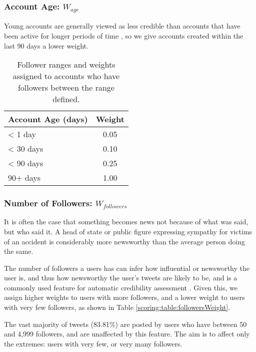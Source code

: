 \subsubsection{Account Age: \(W_{age}\)}
Young accounts are generally viewed as less credible than accounts that have been active for longer periods of time \citep{Sikdar13}, so we give accounts created within the last 90 days a lower weight.

\begin{table}[ht]
	\centering

	\caption{Follower ranges and weights assigned to accounts who have followers between the range defined.}

	\begin{tabulary}{\textwidth}{l c}

	\toprule
	\textbf{Account Age (days)} & \textbf{Weight} \\
	\midrule
		< 1 day & 0.05 \\
		< 30 days & 0.10 \\
		< 90 days & 0.25 \\
		90+ days & 1.00 \\
	\bottomrule
	\end{tabulary}

	\label{scoring:table:accountAge}

\end{table}

\subsubsection{Number of Followers: \(W_{followers}\)}
It is often the case that something becomes news not because of what was said, but who said it. A head of state or public figure expressing sympathy for victims of an accident is considerably more newsworthy than the average person doing the same.

The number of followers a users has can infer how influential or newsworthy the user is, and thus how newsworthy the user's tweets are likely to be, and is a commonly used feature for automatic credibility assessment \citep{Kang12, Sikdar13, Gun14, Madhawa15}.
Given this, we assign higher weights to users with more followers, and a lower weight to users with very few followers, as shown in Table \ref{scoring:table:followersWeight}.

The vast majority of tweets (83.81\%) are posted by users who  have between 50 and 4,999 followers, and are unaffected by this feature. The aim is to affect only the extremes: users with very few, or very many followers.

